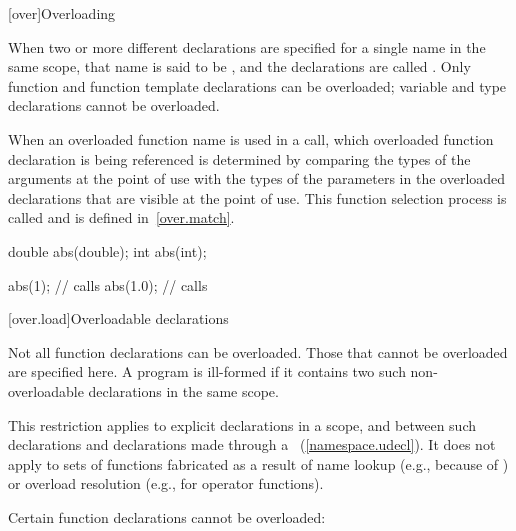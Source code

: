 [over]{Overloading}%


\pnum
{}%
%
When two or more different declarations are specified for a single name
in the same scope, that name is said to be
,
and the declarations
are called
.
Only function and function template
declarations can be overloaded; variable and type declarations
cannot be overloaded.

\pnum
When an overloaded function name is used in a call, which overloaded function
declaration is being referenced is determined by comparing the types
of the arguments at the point of use with the types of the parameters
in the overloaded declarations that are visible at the point of use.
This function selection process is called
and
is defined in~\ref{over.match}.
\begin{example}

%
\begin{codeblock}
double abs(double);
int abs(int);

abs(1);             // calls 
abs(1.0);           // calls 
\end{codeblock}
\end{example}

[over.load]{Overloadable declarations}
%

\pnum
{}%
Not all function declarations can be overloaded.
Those that cannot be
overloaded are specified here.
A program is ill-formed if it contains
two such non-overloadable declarations in the same scope.
\begin{note}
This restriction applies to explicit declarations in a scope, and between
such declarations and
declarations made through a
~(\ref{namespace.udecl}).
It does not apply to sets of functions fabricated as a result of
name lookup (e.g., because of
)
or overload resolution
(e.g., for operator functions).
\end{note}

\pnum
Certain function declarations cannot be overloaded:

